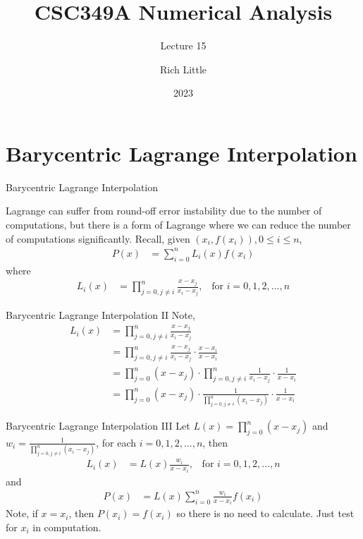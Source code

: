 \documentclass[12pt]{beamer}
\title[CSC349A Numerical Analysis]{CSC349A Numerical Analysis}
\subtitle[Lecture 15]{Lecture 15}
\date[2023]{2023}
\author[R. Little]{Rich Little}
\institute[University of Victoria]{University of Victoria}
\begin{document}
\frame{\maketitle} %



\section{Barycentric Lagrange Interpolation}

\begin{frame}{Barycentric Lagrange Interpolation} 

Lagrange can suffer from round-off error instability due to the number of computations, but there is a form of Lagrange where we can reduce the number of computations significantly. Recall, given ${(x_i,f(x_i))}, 0 \leq i \leq n$, 
\begin{align*}
P(x) &= \sum_{i=0}^{n} L_i(x) f(x_i)
\end{align*}
where
\begin{align*}
L_i(x) &= \prod_{j=0,j \neq i}^{n} \frac{x-x_j}{x_i-x_j}, \;\;\; \mbox{for } i=0,1,2,\dots,n 
\end{align*}

\end{frame} 

\begin{frame}{Barycentric Lagrange Interpolation II} 
Note,
\begin{align*}
L_i(x) &= \prod_{j=0,j \neq i}^{n} \frac{x-x_j}{x_i-x_j} \\
&= \prod_{j=0,j \neq i}^{n} \frac{x-x_j}{x_i-x_j} \cdot \frac{x-x_i}{x-x_i} \\
&= \prod_{j=0}^{n} (x-x_j) \cdot \prod_{j=0,j \neq i}^{n} \frac{1}{x_i-x_j} \cdot \frac{1}{x-x_i} \\
&= \prod_{j=0}^{n} (x-x_j) \cdot \frac{1}{\prod_{j=0,j \neq i}^{n}(x_i-x_j)} \cdot \frac{1}{x-x_i}
\end{align*}
\end{frame} 

 
\begin{frame}{Barycentric Lagrange Interpolation III} 
Let $L(x)=\prod_{j=0}^{n} (x-x_j)$ and $w_i=\frac{1}{\prod_{j=0,j \neq i}^{n}(x_i-x_j)}$, for each $i=0,1,2,\dots,n$, then
\begin{align*}
L_i(x) &=L(x)\frac{w_i}{x-x_i}, \;\;\; \mbox{for } i=0,1,2,\dots,n
\end{align*}
and
\begin{align*}
P(x) &= L(x)\sum_{i=0}^{n} \frac{w_i}{x-x_i} f(x_i)
\end{align*}
Note, if $x=x_i$, then $P(x_i)=f(x_i)$ so there is no need to calculate. Just test for $x_i$ in computation.
\end{frame} 
\end{document}
